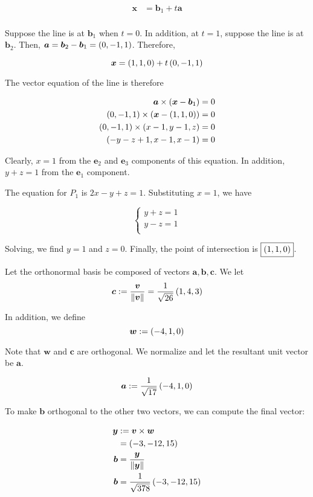 \documentclass{article}
\begin{document}
\begin{align*}
  \bm{x} &= \bm{b}_1 + t \bm{a} \\
\end{align*}

Suppose the line is at $\bm{b}_1$ when $t=0$.
In addition, at $t=1$, suppose the line is at $\bm{b}_2$.
Then, $\bm{a} = \bm{b}_2 - \bm{b}_1 = \left ( 0, -1, 1 \right)$.
Therefore,

$$
\bm{x} = \left ( 1, 1, 0 \right) + t \left ( 0, -1, 1 \right)
$$

The vector equation of the line is therefore

\begin{align*}
  \bm{a} \times \left ( \bm{x} - \bm{b}_1 \right) &= 0 \\
  \left ( 0, -1, 1 \right) \times \left ( \bm{x} - \left ( 1, 1, 0 \right) \right) &= 0 \\
  \left ( 0, -1, 1 \right) \times \left ( x - 1, y - 1, z \right) &= 0 \\
  \left ( -y-z+1, x-1, x-1 \right) &=0 \\
\end{align*}

Clearly, $x=1$ from the $\bm{e}_2$ and $\bm{e}_3$ components of this equation.
In addition, $y + z = 1$ from the $\bm{e}_1$ component.

The equation for $P_1$ is $2x-y+z=1$.
Substituting $x=1$, we have

$$
\begin{cases}
  y + z = 1 \\
  y - z = 1 \\
\end{cases}
$$

Solving, we find $y=1$ and $z=0$.
Finally, the point of intersection is $\boxed{\left ( 1, 1, 0 \right)}$.

Let the orthonormal basis be composed of vectors $\bm{a}, \bm{b}, \bm{c}$.
We let
$$\bm{c} := \frac{\bm{v}}{\left\lVert\bm{v}\right\rVert} = \frac{1}{\sqrt{26}} \left ( 1, 4, 3 \right)$$

In addition, we define
$$
\bm{w} := \left ( -4, 1, 0 \right)
$$

Note that $\bm{w}$ and $\bm{c}$ are orthogonal.
We normalize and let the resultant unit vector be $\bm{a}$.

$$
\bm{a} := \frac{1}{\sqrt{17}} \left ( -4, 1, 0 \right)
$$

To make $\bm{b}$ orthogonal to the other two vectors, we can compute the final vector:

\begin{align*}
  \bm{y} & := \bm{v} \times \bm{w} \\
         &= \left ( -3, -12, 15 \right) \\
  \bm{b} &= \frac{\bm{y}}{\left\lVert\bm{y}\right\rVert} \\
  \bm{b} &= \frac{1}{\sqrt{378}} \left ( -3, -12, 15 \right) \\
\end{align*}
\end{document}
